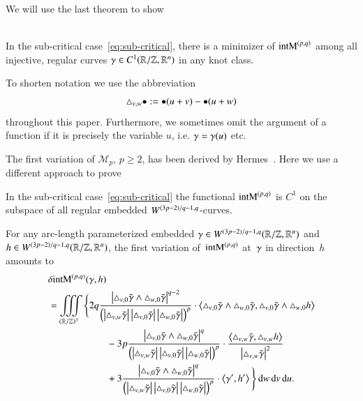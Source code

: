 We will use the last theorem to show

\begin{theorem}[\secB]\label{thm:existence}\hfill\\
 In the sub-critical case~\eqref{eq:sub-critical},
 there is a minimizer of 
 $\E$ among all injective, regular curves 
 $\g \in C^1(\R / \Z, \R^n)$ in any knot class.
\end{theorem}

To shorten notation we use the abbreviation
\begin{equation}\label{eq:short-notation}
 \T[\bullet]{v}{w}:=\D[\bullet]vw
\end{equation}
throughout this paper.
Furthermore, we sometimes omit the argument of a function if it is precisely the variable $u$, i.e.\@
$\g=\g(u)$ etc.

The first variation of $\mathscr M_{p}$, $p\ge2$,
has been derived by Hermes~\cite[Thm.~2.33, Rem.~2.35]{hermes}.
Here we use a different approach to prove

\begin{theorem}[\secC]\label{thm:first-var}%
 In the sub-critical case~\eqref{eq:sub-critical}
 the functional $\E$ is $C^1$ on the subspace of all regular embedded
 $\W$-curves.

 For any arc-length parameterized embedded $\g\in\W\rzd$
 and $h\in\W\rzd$, the first variation of~$\E$ at~$\g$ in direction~$h$
 amounts to%
 \begin{equation}\label{eq:dE-intro}
 \begin{split}
   &\delta\E(\g,h) \\
   &= \iiint\limits_{(\mathbb R / \mathbb Z)^3} \Bigg\{
 2q\frac{\abs{\T v0\wedge\T w0}^{q-2}}{\br{\abs{\T vw}\abs{\T v0}\abs{\T w0}}^p}
 \cdot{\sp{\T v0\wedge\T w0,\T v0\wedge\T[h] w0}} \\
 &\qquad\qquad\qquad{}-3p\frac{\abs{\T v0\wedge\T w0}^{q}}{\br{\abs{\T vw}\abs{\T v0}\abs{\T w0}}^p}\cdot\frac{\sp{\T vw,\T[h] vw}}{\abs{\T vw}^{2}}\\
 &\qquad\qquad\qquad{}+3\frac{\abs{\T v0\wedge\T w0}^{q}}{\br{\abs{\T vw}\abs{\T v0}\abs{\T w0}}^p}\cdot\sp{\dg,\dh}
\Bigg\}\d w\d v\d u.%
 \end{split}
 \end{equation}
\end{theorem}

